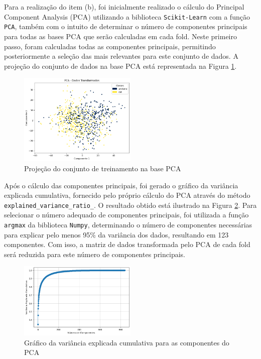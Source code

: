 \documentclass[]{abntex2}
\begin{document}
\newpage

Para a realização do item (b), foi inicialmente realizado o cálculo do Principal Component Analysis (PCA) utilizando a biblioteca \texttt{Scikit-Learn} com a função \texttt{PCA}, também com o intuito de determinar o número de componentes principais para todas as bases PCA que serão calculadas em cada fold. Neste primeiro passo, foram calculadas todas as componentes principais, permitindo posteriormente a seleção das mais relevantes para este conjunto de dados. A projeção do conjunto de dados na base PCA está representada na Figura \ref{fig:PCA}.

\begin{figure}[H]
    \centering 
    \includegraphics[width=0.5\textwidth]{imgs/ex1/PCA.png}
    \caption{Projeção do conjunto de treinamento na base PCA}
    \label{fig:PCA} %
\end{figure}

Após o cálculo das componentes principais, foi gerado o gráfico da variância explicada cumulativa, fornecido pelo próprio cálculo do PCA através do método \texttt{explained\_variance\_ratio\_}. O resultado obtido está ilustrado na Figura \ref{fig:vari_pca}. Para selecionar o número adequado de componentes principais, foi utilizada a função \texttt{argmax} da biblioteca \texttt{Numpy}, determinando o número de componentes necessárias para explicar pelo menos 95\% da variância dos dados, resultando em 123 componentes. Com isso, a matriz de dados transformada pelo PCA de cada fold será reduzida para este número de componentes principais.

\begin{figure}[H]
    \centering 
    \includegraphics[width=0.5\textwidth]{imgs/ex1/vari_pca.png}
    \caption{Gráfico da variância explicada cumulativa para as componentes do PCA}
    \label{fig:vari_pca} %
\end{figure}
\end{document}
